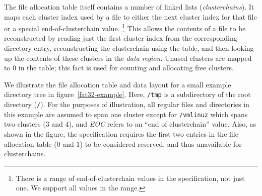 \documentclass[submission,copyright,creativecommons]{eptcs}
\begin{document}
The file allocation table itself contains a number of linked lists
(\textit{clusterchains}). It
maps each cluster index used by a file to either the next cluster
index for that file or a special end-of-clusterchain value. \footnote{
There is a range of end-of-clusterchain values in the
specification, not just one. We support all values in the range.} This
allows the contents of a file to be reconstructed by
reading just the first cluster index from the corresponding directory
entry, reconstructing the clusterchain using the table, and then
looking up the contents of these clusters in the \textit{data
  region}. Unused clusters are mapped to 0 in the table; this fact is
used for counting and allocating free clusters.

We illustrate the file allocation table and data layout for a small
example directory tree in figure~\ref{fat32-example}. Here,
\texttt{/tmp} is a subdirectory of the root directory
(\texttt{/}). For the purposes of illustration, all regular files and
directories in this example are assumed to span one cluster except for
\texttt{/vmlinuz} which spans two clusters ($3$ and $4$), and
\textit{EOC} refers to an ``end of clusterchain'' value. Also, as
shown in the figure, the specification requires the first two entries
in the file allocation table ($0$ and $1$) to be considered reserved,
and thus unavailable for clusterchains.
\end{document}
